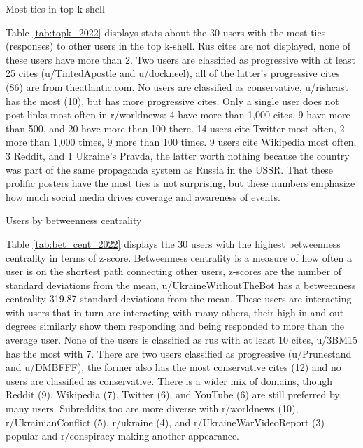\documentclass[doublespacing]{utdthesis}
\begin{document}
\begin{table}[!ht]
\footnotesize
\centering
\caption{Most ties in top k-shell}

\label{tab:topk_2022}
\end{table}

Table \ref{tab:topk_2022} displays stats about the 30 users with the most ties (responses) to other users in the top k-shell.
Rus cites are not displayed, none of these users have more than 2.
Two users are classified as progressive with at least 25 cites (u/TintedApostle and u/dockneel), all of the latter's progressive cites (86) are from theatlantic.com.
No users are classified as conservative, u/rishcast has the most (10), but has more progressive cites.
Only a single user does not post links most often in r/worldnews: 4 have more than 1,000 cites, 9 have more than 500, and 20 have more than 100 there.
14 users cite Twitter most often, 2 more than 1,000 times, 9 more than 100 times.
9 users cite Wikipedia most often, 3 Reddit, and 1 Ukraine's Pravda, the latter worth nothing because the country was part of the same propaganda system as Russia in the USSR.
That these prolific posters have the most ties is not surprising, but these numbers emphasize how much social media drives coverage and awareness of events.

\begin{table}[!ht]
\centering
\scriptsize
\caption{Users by betweenness centrality}

\label{tab:bet_cent_2022}
\end{table}

Table \ref{tab:bet_cent_2022} displays the 30 users with the highest betweenness centrality in terms of z-score.
Betweenness centrality is a measure of how often a user is on the shortest path connecting other users, z-scores are the number of standard deviations from the mean, u/UkraineWithoutTheBot has a betweenness centrality 319.87 standard deviations from the mean.
These users are interacting with users that in turn are interacting with many others, their high in and out-degrees similarly show them responding and being responded to more than the average user.
None of the users is classified as rus with at least 10 cites, u/3BM15 has the most with 7.
There are two users classified as progressive (u/Prunestand and u/DMBFFF), the former also has the most conservative cites (12) and no users are classified as conservative.
There is a wider mix of domains, though Reddit (9), Wikipedia (7), Twitter (6), and YouTube (6) are still preferred by many users.
Subreddits too are more diverse with r/worldnews (10), r/UkrainianConflict (5), r/ukraine (4), and r/UkraineWarVideoReport (3) popular and r/conspiracy making another appearance.
\end{document}

